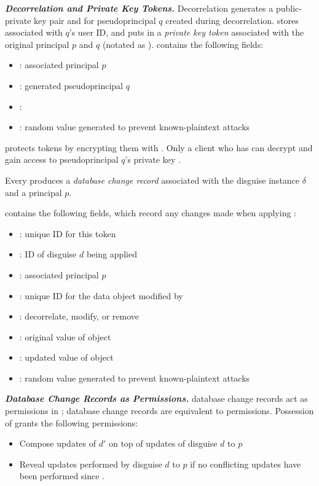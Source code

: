 \noindent\textbf{\emph{Decorrelation and Private Key Tokens.}}
Decorrelation generates a public-private key pair  and  for pseudoprincipal $q$
created during decorrelation.
\sys stores  associated with $q$'s user ID, and puts  in a \emph{private key token}
associated with the original principal $p$ and $q$  (notated as ).  contains the following fields:
\begin{itemize}
\item {}: associated principal $p$
\item {}: generated pseudoprincipal $q$
\item {}: 
\item {}: random value generated to prevent known-plaintext attacks
\end{itemize}

\noindent \sys protects  tokens by encrypting them with . Only a client who has
 can decrypt  and gain access to pseudoprincipal $q$'s private key .

Every  produces a \emph{database change record}  associated with the disguise instance $\delta$ and a
principal $p$. 

 contains the following fields, which record any changes made when applying :
%
\begin{itemize}
\item {}: unique ID for this token
\item {}: ID of disguise $d$ being applied
\item {}: associated principal $p$
\item {}: unique ID for the data object modified by 
\item {}: decorrelate, modify, or remove
\item {}: original value of object 
\item {}: updated value of object 
\item {}: random value generated to prevent known-plaintext attacks
\end{itemize}

\noindent\textbf{\emph{Database Change Records as Permissions.}}
database change records act as permissions in \sys; database change records are equivalent to permissions.
%
Possession of  grants the following permissions:
\begin{itemize}
    \item Compose updates of $d'$ on top of updates of disguise $d$ to $p$
    \item Reveal updates performed by disguise $d$ to $p$ if no conflicting updates have been
        performed since
.
\end{itemize}


